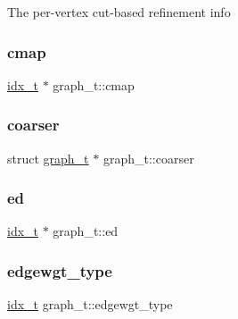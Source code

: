 The per-\/vertex cut-\/based refinement info \mbox{\label{structgraph__t_a7f6d2c556b08aa7a33d55374e0a60c7f}} 
\subsubsection{\texorpdfstring{cmap}{cmap}}
{\footnotesize\ttfamily \hyperlink{3rd_party_2parmetis-4_80_83_2metis_2include_2metis_8h_aaa5262be3e700770163401acb0150f52}{idx\+\_\+t} $\ast$ graph\+\_\+t\+::cmap}

\mbox{\label{structgraph__t_af034b18760cf454996118bd134629a6d}} 
\subsubsection{\texorpdfstring{coarser}{coarser}}
{\footnotesize\ttfamily struct \hyperlink{structgraph__t}{graph\+\_\+t} $\ast$ graph\+\_\+t\+::coarser}

\mbox{\label{structgraph__t_a256cdae58ac787960335877a2a2349b4}} 
\subsubsection{\texorpdfstring{ed}{ed}}
{\footnotesize\ttfamily \hyperlink{3rd_party_2parmetis-4_80_83_2metis_2include_2metis_8h_aaa5262be3e700770163401acb0150f52}{idx\+\_\+t} $\ast$ graph\+\_\+t\+::ed}

\mbox{\label{structgraph__t_ae70d9595efe0791ad2585b7a54ff1f6b}} 
\subsubsection{\texorpdfstring{edgewgt\+\_\+type}{edgewgt\_type}}
{\footnotesize\ttfamily \hyperlink{3rd_party_2parmetis-4_80_83_2metis_2include_2metis_8h_aaa5262be3e700770163401acb0150f52}{idx\+\_\+t} graph\+\_\+t\+::edgewgt\+\_\+type}

